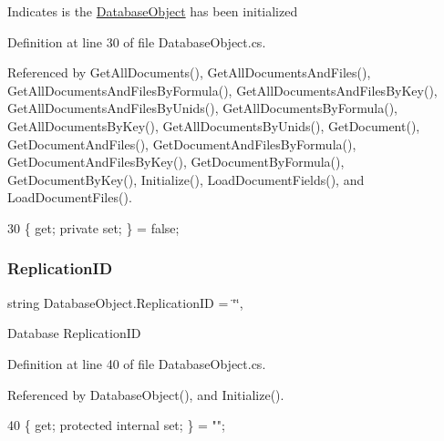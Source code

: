 Indicates is the \mbox{\hyperlink{class_database_object}{Database\+Object}} has been initialized 



Definition at line 30 of file Database\+Object.\+cs.



Referenced by Get\+All\+Documents(), Get\+All\+Documents\+And\+Files(), Get\+All\+Documents\+And\+Files\+By\+Formula(), Get\+All\+Documents\+And\+Files\+By\+Key(), Get\+All\+Documents\+And\+Files\+By\+Unids(), Get\+All\+Documents\+By\+Formula(), Get\+All\+Documents\+By\+Key(), Get\+All\+Documents\+By\+Unids(), Get\+Document(), Get\+Document\+And\+Files(), Get\+Document\+And\+Files\+By\+Formula(), Get\+Document\+And\+Files\+By\+Key(), Get\+Document\+By\+Formula(), Get\+Document\+By\+Key(), Initialize(), Load\+Document\+Fields(), and Load\+Document\+Files().


\begin{DoxyCode}
30 \{ \textcolor{keyword}{get}; \textcolor{keyword}{private} \textcolor{keyword}{set}; \} = \textcolor{keyword}{false};
\end{DoxyCode}
\mbox{\label{class_database_object_aaa091ee1a9a86d2d10fe2381ee2d1f4c}} 
\subsubsection{\texorpdfstring{Replication\+ID}{ReplicationID}}
{\footnotesize\ttfamily string Database\+Object.\+Replication\+ID = \char`\"{}\char`\"{}\hspace{0.3cm}{\ttfamily [get]}, {\ttfamily [set]}}



Database Replication\+ID 



Definition at line 40 of file Database\+Object.\+cs.



Referenced by Database\+Object(), and Initialize().


\begin{DoxyCode}
40 \{ \textcolor{keyword}{get}; \textcolor{keyword}{protected} \textcolor{keyword}{internal} \textcolor{keyword}{set}; \} = \textcolor{stringliteral}{""};
\end{DoxyCode}
\mbox{\label{class_database_object_ad6bfcd30152f7a115ac5a1c7fbfa9fcb}} 
